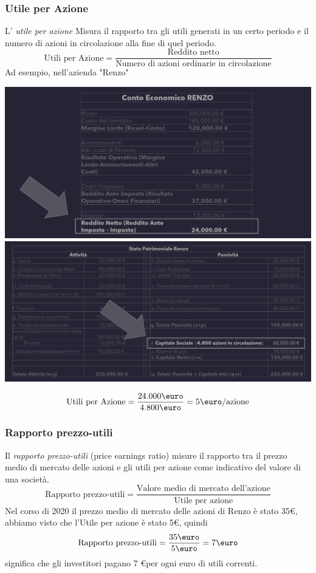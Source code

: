 \documentclass{article}
\begin{document}
\subsubsection{Utile per Azione}
L' \textit{utile per azione} Misura il rapporto tra gli utili generati in un certo periodo e il numero di azioni in  circolazione alla fine di quel periodo.
\[
    \text{Utili per Azione} = \frac{\text{Reddito netto}}{\text{Numero di azioni ordinarie in circolazione}}
\]
Ad esempio, nell'azienda "Renzo"
\begin{center}
    \includegraphics[scale=0.25]{Image/Ce_Renzo.png}
    \includegraphics[scale=0.25]{Image/Stato patrimoniale Renzo.png}
\end{center}
\[
    \text{Utili per Azione} = \frac{24.000 \text{\euro}}{4.800 \text{\euro}} = 5 \text{\euro}/\text{azione}
\]

 


\subsubsection{Rapporto prezzo-utili}
Il \textit{rapporto prezzo-utili} (price earnings ratio) misure il rapporto tra il prezzo medio di mercato delle azioni e gli utili per azione come indicativo del valore di una società.
\[
    \text{Rapporto prezzo-utili} = \frac{\text{Valore medio di mercato dell'azione}}{\text{Utile per azione}}
\]
Nel corso di 2020 il prezzo medio di mercato delle azioni di Renzo è stato 35€, abbiamo visto che l'Utile per azione è stato 5€, quindi
\[
    \text{Rapporto prezzo-utili} = \frac{35 \text{\euro}}{5 \text{\euro}} = 7 \text{\euro}
\]
significa che gli investitori pagano 7 \euro per ogni euro di utili correnti.
\end{document}
